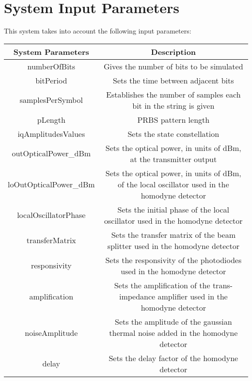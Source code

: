 \documentclass[a4paper]{article}
\begin{document}
\section{System Input Parameters}

This system takes into account the following input parameters:

\begin{savenotes}
\begin{table}[H]
\centering
\begin{tabulary}{1.0\textwidth}{|C|C|}
\hline
\textbf{System Parameters} & \textbf{Description} 																 \\ \hline
numberOfBits               & Gives the number of bits to be simulated		          										 \\ \hline  
bitPeriod                  & Sets the time between adjacent bits                                                           \\ \hline 
samplesPerSymbol           & Establishes the number of samples each bit in the string is given \footnotemark[1]	         \\ \hline
pLength                    & PRBS pattern length					                      									 \\ \hline  
iqAmplitudesValues         & Sets the state constellation																	 \\ \hline  
outOpticalPower\_dBm       & Sets the optical power, in units of dBm, at the transmitter output							 \\ \hline  
loOutOpticalPower\_dBm     & Sets the optical power, in units of dBm, of the local oscillator used in the homodyne detector \\ \hline  
localOscillatorPhase       & Sets the initial phase of the local oscillator used in the homodyne detector					 \\ \hline  
transferMatrix             & Sets the transfer matrix of the beam splitter used in the homodyne detector					 \\ \hline  
responsivity               & Sets the responsivity of the photodiodes used in the homodyne detector						 \\ \hline  
amplification              & Sets the amplification of the trans-impedance amplifier used in the homodyne detector			 \\ \hline  
noiseAmplitude             & Sets the amplitude of the gaussian thermal noise added in the homodyne detector				 \\ \hline  
delay                      & Sets the delay factor of the homodyne detector												 \\ \hline  

\end{tabulary}
\end{table}
\end{savenotes}
\end{document}
